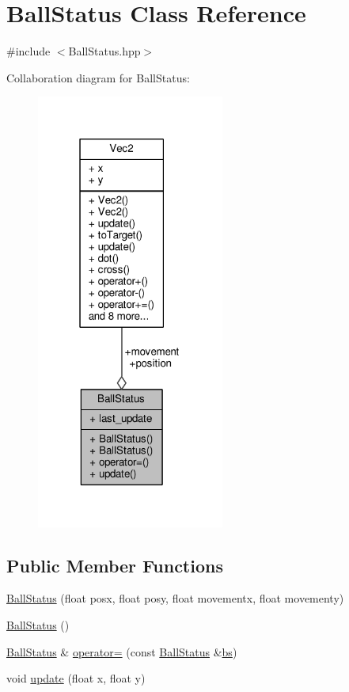 \hypertarget{class_ball_status}{}\section{Ball\+Status Class Reference}
\label{class_ball_status}


{\ttfamily \#include $<$Ball\+Status.\+hpp$>$}



Collaboration diagram for Ball\+Status\+:\nopagebreak
\begin{figure}[H]
\begin{center}
\leavevmode
\includegraphics[width=175pt]{class_ball_status__coll__graph}
\end{center}
\end{figure}
\subsection*{Public Member Functions}
\begin{DoxyCompactItemize}
\item 
\hyperlink{class_ball_status_aa386a95ecc7b3968acd8f683587aa11c}{Ball\+Status} (float posx, float posy, float movementx, float movementy)
\item 
\hyperlink{class_ball_status_aa52a3da020cc2545b3c3fd8bd7944246}{Ball\+Status} ()
\item 
\hyperlink{class_ball_status}{Ball\+Status} \& \hyperlink{class_ball_status_a02508ed35c2fe08e41f99b3c1e36bffe}{operator=} (const \hyperlink{class_ball_status}{Ball\+Status} \&\hyperlink{jquery_8js_ae77642f8ef73fb9c20c2a737d956acda}{bs})
\item 
void \hyperlink{class_ball_status_a248375c08a18fd1d6975dd8e8bbf6923}{update} (float x, float y)
\end{DoxyCompactItemize}
